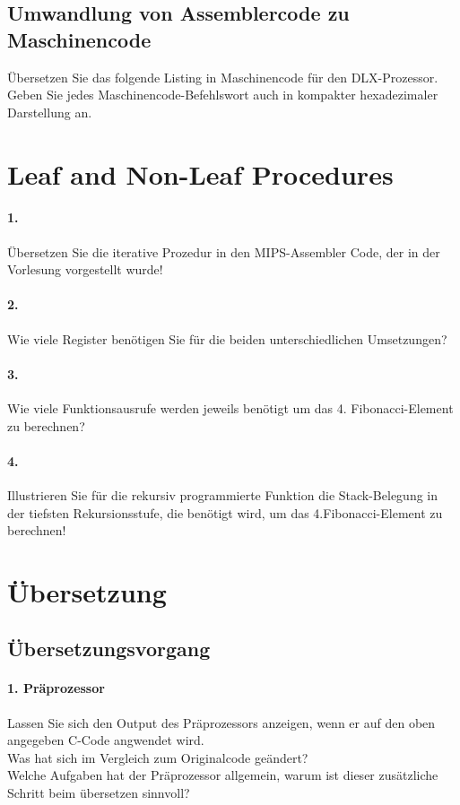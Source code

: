 \documentclass[paper=a4, fontsize=11pt]{scrartcl}
\numberwithin{equation}{section}
\numberwithin{figure}{section}
\numberwithin{table}{section}
\begin{document}
\subsection{Umwandlung von Assemblercode zu Maschinencode}
Übersetzen Sie das folgende Listing in Maschinencode für den DLX-Prozessor. Geben Sie jedes Maschinencode-Befehlswort auch in kompakter hexadezimaler Darstellung an.

\section{Leaf and Non-Leaf Procedures}

\paragraph{1.}
Übersetzen Sie die iterative Prozedur in den MIPS-Assembler Code, der in der Vorlesung vorgestellt wurde!

\paragraph{2.}
Wie viele Register benötigen Sie für die beiden unterschiedlichen Umsetzungen?

\paragraph{3.}
Wie viele Funktionsausrufe werden jeweils benötigt um das 4. Fibonacci-Element zu berechnen?

\paragraph{4.}
Illustrieren Sie für die rekursiv programmierte Funktion die Stack-Belegung in der tiefsten Rekursionsstufe, die benötigt wird, um das 4.Fibonacci-Element zu berechnen!

\section{Übersetzung}
\subsection{Übersetzungsvorgang}

\paragraph{1. Präprozessor}
Lassen Sie sich den Output des Präprozessors anzeigen, wenn er auf den oben angegeben C-Code angwendet wird. \\
Was hat sich im Vergleich zum Originalcode geändert? \\
Welche Aufgaben hat der Präprozessor allgemein, warum ist dieser zusätzliche Schritt beim übersetzen sinnvoll?
\end{document}
